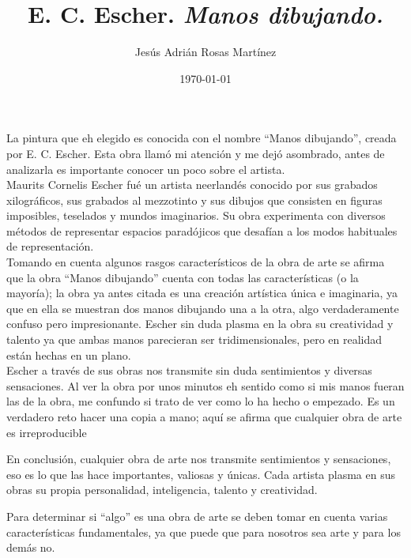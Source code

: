 \documentclass[12pt]{article}
\title{E. C. Escher. \emph{Manos dibujando.}}
\author{\small{Jes\'us Adri\'an Rosas Mart\'inez}}
\date{\small{\today}}
\begin{document}
\maketitle %

La pintura que eh elegido es conocida con el nombre ``Manos dibujando'', creada por E. C. Escher. Esta obra llamó mi atención y me dejó asombrado, antes de analizarla es importante conocer un poco sobre el artista.\\

Maurits Cornelis Escher fué un artista neerlandés conocido por sus grabados xilográficos, sus grabados al mezzotinto y sus dibujos que consisten en figuras imposibles, teselados y mundos imaginarios.  Su obra experimenta con diversos métodos de representar espacios paradójicos que desafían a los modos habituales de representación. \\

Tomando en cuenta algunos rasgos característicos de la obra de arte se afirma que la obra ``Manos dibujando'' cuenta con todas las características (o la mayoría); la obra ya antes citada es una creación artística única e imaginaria, ya que en ella se muestran dos manos dibujando una a la otra, algo verdaderamente confuso pero impresionante. Escher sin duda plasma en la obra su creatividad y talento ya que ambas manos parecieran ser tridimensionales, pero en realidad están hechas en un plano.\\

Escher a través de sus obras nos transmite sin duda sentimientos y diversas sensaciones. Al ver la obra por unos minutos eh sentido como si mis manos fueran las de la obra, me confundo si trato de ver como lo ha hecho o empezado. Es un verdadero reto hacer una copia a mano; aquí se afirma que cualquier obra de arte es irreproducible \\

{En conclusión, cualquier obra de arte nos transmite sentimientos y sensaciones, eso es lo que las hace importantes, valiosas y únicas. Cada artista plasma en sus obras su propia personalidad, inteligencia, talento y creatividad. 

Para determinar si ``algo'' es una obra de arte se deben tomar en cuenta varias características fundamentales, ya que puede que para nosotros sea arte y para los demás no.} \\
\end{document}
